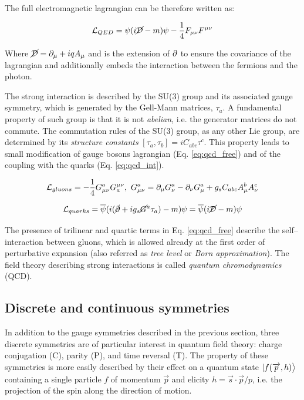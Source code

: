 The full electromagnetic lagrangian can be therefore written as:

\begin{equation}
\mathcal{L}_{QED} = \psi(i\cancel{\mathcal{D}} - m)\psi - \dfrac{1}{4} F_{\mu\nu} F^{\mu\nu}
\end{equation}

Where $\cancel{\mathcal{D}} = \partial_\mu + i q A_\mu$ and is the extension of $\partial$ to ensure the covariance of the lagrangian and additionally embeds the interaction between the fermions and the photon.

The strong interaction is described by the SU(3) group and its associated gauge symmetry, which is generated by the Gell-Mann matrices, $\tau_a$. A fundamental property of such group is that it is not \emph{abelian}, i.e. the generator matrices do not commute. The commutation rules of the SU(3) group, as any other Lie group, are determined by its \emph{structure constants} $[\tau_a, \tau_b] = i C_{abc} \tau^c$. This property leads to small modification of gauge bosons lagrangian (Eq. \ref{eq:qcd_free}) and of the coupling with the quarks (Eq. \ref{eq:qcd_int}).

\begin{equation}
\mathcal{L}_{gluons} = - \dfrac{1}{4} G^{a}_{\mu\nu}  G_{a}^{\mu\nu}, \, \, G^{a}_{\mu\nu} = \partial_\mu G^a_\nu - \partial_\nu G^a_\mu + g_s C_{abc} A^b_\mu A^c_\nu
\label{eq:qcd_free}
\end{equation}

\begin{equation}
\mathcal{L}_{quarks} = \overline{\psi} ( i (\cancel{\partial} + i g_s \cancel{G}^a \tau_a) - m ) \psi = \overline{\psi} ( i \cancel{\mathcal{D}} - m ) \psi
\label{eq:qcd_int}
\end{equation}

The presence of trilinear and quartic terms in Eq. \ref{eq:qcd_free} describe the self--interaction between gluons, which is allowed already at the first order of perturbative expansion (also referred as \emph{tree level} or \emph{Born approximation}). The field theory describing strong interactions is called \emph{quantum chromodynamics} (QCD).

\subsection{Discrete and continuous symmetries}

In addition to the gauge symmetries described in the previous section, three discrete symmetries are of particular interest in quantum field theory: charge conjugation (C), parity (P), and time reversal (T). The property of these symmetries is more easily described by their effect on a quantum state $|f(\overrightarrow{p}, h)\big{>}$ containing a single particle $f$ of momentum $\vec{p}$ and elicity $h = \vec{s} \cdot \vec{p} / p$, i.e. the projection of the spin along the direction of motion.

